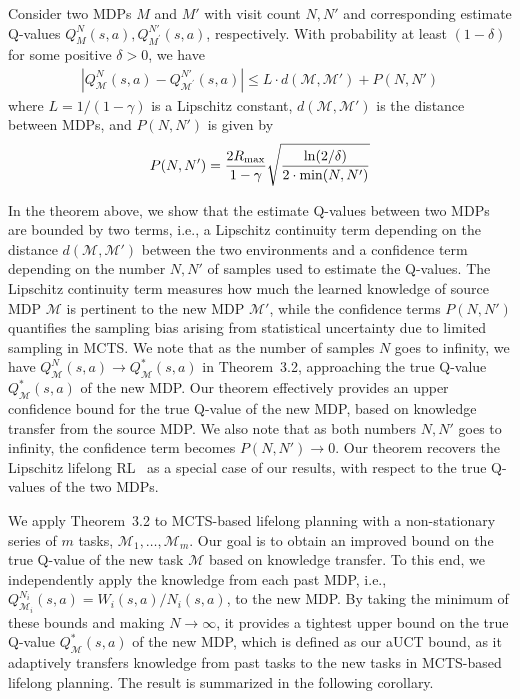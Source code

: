\begin{theorem}
\label{Optimal_Q_Lipschitz}
Consider two MDPs \( M \) and \({M}'\) with visit count $N,N'$ and corresponding estimate Q-values $Q_M^{N}(s,a), Q_{M^\prime}^{N'}(s,a)$, respectively. With probability at least $(1-\delta)$ for some positive $\delta>0$, we have
\begin{equation}
\label{eqn:aUCT}
\begin{aligned}
    \left|Q_{\mathcal{M}}^{N}(s,a)-Q_{\mathcal{M}^\prime}^{N'}(s,a)\right|\leq L\cdot d(\mathcal{M},\mathcal{M}') + P(N,N')
\end{aligned} 
\end{equation}
where $L={1}/({1-\gamma})$ is a Lipschitz constant, $d(\mathcal{M},\mathcal{M}')$ is the distance between MDPs, and $P(N,N')$ is given by
\begin{equation}
\label{eqn:aUCT1}
P(N,N') = \frac{2R_{\max}}{1-\gamma}\sqrt{\frac{\ln(2/\delta)}{2\cdot {\rm min}(N,N')}}
\end{equation}
\end{theorem}
In the theorem above, we show that the estimate Q-values between two MDPs are bounded by two terms, i.e., a Lipschitz continuity term depending on the distance $d(\mathcal{M},\mathcal{M}')$ between the two environments and a confidence term depending on the number $N, N'$ of samples used to estimate the Q-values. The Lipschitz continuity term measures how much the learned knowledge of source MDP $\mathcal{M}$ is pertinent to the new MDP $\mathcal{M}'$, while the confidence terms $P(N,N')$ quantifies the sampling bias arising from statistical uncertainty due to limited sampling in MCTS. We note that as the number of samples $N$ goes to infinity, we have $Q_{\mathcal{M}}^{N}(s,a)\rightarrow Q_{\mathcal{M}}^{*}(s,a)$ in Theorem~3.2, approaching the true Q-value $Q_{\mathcal{M}}^{*}(s,a)$ of the new MDP. Our theorem effectively provides an upper confidence bound for the true  Q-value of the new MDP, based on knowledge transfer from the source MDP. We also note that as both numbers $N,N'$ goes to infinity, the confidence term becomes $P(N,N')\rightarrow 0$. Our theorem recovers the Lipschitz lifelong RL~\cite{lecarpentier2021lipschitzlifelongreinforcementlearning} as a special case of our results, with respect to the true Q-values of the two MDPs. 

We apply Theorem~3.2 to MCTS-based lifelong planning with a non-stationary series of $m$ tasks, $\mathcal{M}_1,\ldots,\mathcal{M}_m$. Our goal is to obtain an improved bound on the true Q-value of the new task $\mathcal{M}$ based on knowledge transfer. To this end, we independently apply the knowledge from each past MDP, i.e., $Q^{N_i}_{\mathcal{M}_i}(s,a)=W_i(s,a)/N_i(s,a)$, to the new MDP. By taking the minimum of these bounds and making $N\rightarrow \infty$, it provides a tightest upper bound on the true Q-value $Q_{\mathcal{M}}^{*}(s,a)$ of the new MDP, which is defined as our aUCT bound, as it adaptively transfers knowledge from past tasks to the new tasks in MCTS-based lifelong planning. The result is summarized in the following corollary.

